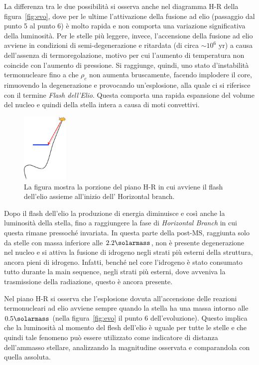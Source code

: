 La differenza tra le due possibilità si osserva anche nel diagramma H-R della figura~\ref{fig:evo}, dove per le ultime l'attivazione della fusione ad elio (passaggio dal punto 5 al punto 6) è molto rapida e non comporta una variazione significativa della luminosità. Per le stelle più leggere, invece, l'accensione della fusione ad elio avviene in condizioni di semi-degenerazione e ritardata (di circa $\sim 10^6 \mbox{ yr}$) a causa dell'assenza di termoregolazione, motivo per cui l'aumento di temperatura non coincide con l'aumento di pressione. Si raggiunge, quindi, uno stato d'instabilità termonucleare fino a che $\rho_c$ non aumenta bruscamente, facendo implodere il core, rimuovendo la degenerazione e provocando un'esplosione, alla quale ci si riferisce con il termine \textit{Flash dell'Elio}. Questa comporta una rapida espansione del volume del nucleo e quindi della stella intera a causa di moti convettivi.
\begin{figure}
    \centering
    \includegraphics[width = 0.2\textwidth]{immagini/he_flash.png}
    \caption{La figura mostra la porzione del piano H-R in cui avviene il flash dell'elio assieme all'inizio dell' Horizontal branch.}\label{fig:flash-he}
\end{figure}

Dopo il flash dell'elio la produzione di energia diminuisce e così anche la luminosità della stella, fino a raggiungere la fase di \textit{Horizontal Branch} in cui questa rimane pressoché invariata. In questa parte della post-MS, raggiunta solo da stelle con massa inferiore alle $2.2 \si{\solarmass}$, non è presente degenerazione nel nucleo e si attiva la fusione di idrogeno negli strati più esterni della struttura, ancora pieni di idrogeno. Infatti, benché nel core l'idrogeno è stato consumato tutto durante la main sequence, negli strati più esterni, dove avveniva la trasmissione della radiazione, questo è ancora presente.

Nel piano H-R si osserva che l'esplosione dovuta all'accensione delle reazioni termonucleari ad elio avviene sempre quando la stella ha una massa intorno alle $0.5 \si{\solarmass}$ (nella figura~\ref{fig:evo} il punto 6 dell'evoluzione). Questo implica che la luminosità al momento del flesh dell'elio è uguale per tutte le stelle e che quindi tale fenomeno può essere utilizzato come indicatore di distanza dell'ammasso stellare, analizzando la magnitudine osservata e comparandola con quella assoluta.

